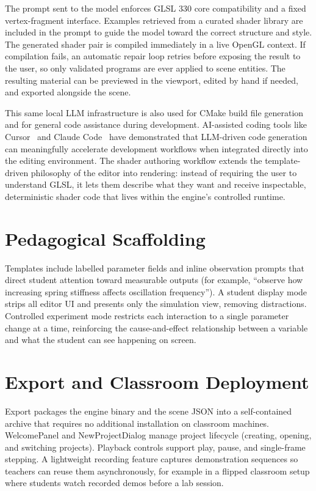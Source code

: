 \documentclass[9pt,openany]{extbook}
\begin{document}
The prompt sent to the model enforces GLSL 330 core compatibility and a fixed vertex-fragment interface. Examples retrieved from a curated shader library are included in the prompt to guide the model toward the correct structure and style. The generated shader pair is compiled immediately in a live OpenGL context. If compilation fails, an automatic repair loop retries before exposing the result to the user, so only validated programs are ever applied to scene entities. The resulting material can be previewed in the viewport, edited by hand if needed, and exported alongside the scene.

This same local LLM infrastructure is also used for CMake build file generation and for general code assistance during development. AI-assisted coding tools like Cursor~\cite{cursor2024} and Claude Code~\cite{claudecode2025} have demonstrated that LLM-driven code generation can meaningfully accelerate development workflows when integrated directly into the editing environment. The shader authoring workflow extends the template-driven philosophy of the editor into rendering: instead of requiring the user to understand GLSL, it lets them describe what they want and receive inspectable, deterministic shader code that lives within the engine's controlled runtime.


\section{Pedagogical Scaffolding}

Templates include labelled parameter fields and inline observation prompts that direct student attention toward measurable outputs (for example, ``observe how increasing spring stiffness affects oscillation frequency''). A student display mode strips all editor UI and presents only the simulation view, removing distractions. Controlled experiment mode restricts each interaction to a single parameter change at a time, reinforcing the cause-and-effect relationship between a variable and what the student can see happening on screen.

\section{Export and Classroom Deployment}

Export packages the engine binary and the scene JSON into a self-contained archive that requires no additional installation on classroom machines. WelcomePanel and NewProjectDialog manage project lifecycle (creating, opening, and switching projects). Playback controls support play, pause, and single-frame stepping. A lightweight recording feature captures demonstration sequences so teachers can reuse them asynchronously, for example in a flipped classroom setup where students watch recorded demos before a lab session.
\end{document}
